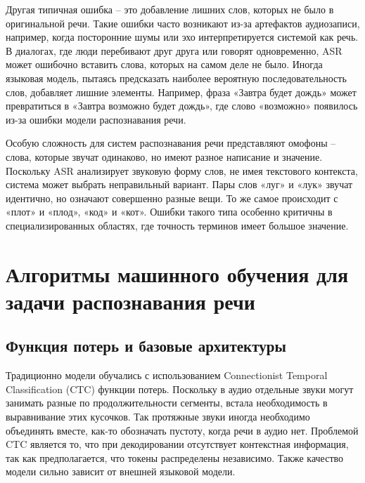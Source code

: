 Другая типичная ошибка -- это добавление лишних слов, которых не было в оригинальной речи.
Такие ошибки часто возникают из-за артефактов аудиозаписи, например, когда посторонние шумы или эхо интерпретируется системой как речь.
В диалогах, где люди перебивают друг друга или говорят одновременно, ASR может ошибочно вставить слова, которых на самом деле не было.
Иногда языковая модель, пытаясь предсказать наиболее вероятную последовательность слов, добавляет лишние элементы.
Например, фраза «Завтра будет дождь» может превратиться в «Завтра возможно будет дождь», где слово «возможно» появилось из-за ошибки модели распознавания речи.

Особую сложность для систем распознавания речи представляют омофоны -- слова, которые звучат одинаково, но имеют разное написание и значение.
Поскольку ASR анализирует звуковую форму слов, не имея текстового контекста, система может выбрать неправильный вариант.
Пары слов «луг» и «лук» звучат идентично, но означают совершенно разные вещи.
То же самое происходит с «плот» и «плод», «код» и «кот».
Ошибки такого типа особенно критичны в специализированных областях, где точность терминов имеет большое значение.

\section{Алгоритмы машинного обучения для задачи распознавания речи}

\subsection{Функция потерь и базовые архитектуры}

Традиционно модели обучались с использованием Connectionist Temporal Classification (CTC) функции потерь\cite{graves2006connectionist}.
Поскольку в аудио отдельные звуки могут занимать разные по продолжительности сегменты, встала необходимость в выравнивание этих кусочков.
Так протяжные звуки иногда необходимо объединять вместе, как-то обозначать пустоту, когда речи в аудио нет.
Проблемой CTC является то, что при декодировании отсутствует контекстная информация, так как предполагается, что токены распределены независимо.
Также качество модели сильно зависит от внешней языковой модели.

